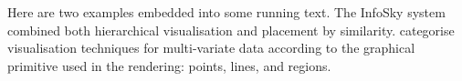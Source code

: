 Here are two examples embedded into some running text. The InfoSky
\parencite{InfoSkyIVS} system combined both hierarchical visualisation
and placement by similarity.
\textcite[Chapter~7]{InteractiveDataVisualisation} categorise
visualisation techniques for multi-variate data according to the
graphical primitive used in the rendering: points, lines, and regions.









